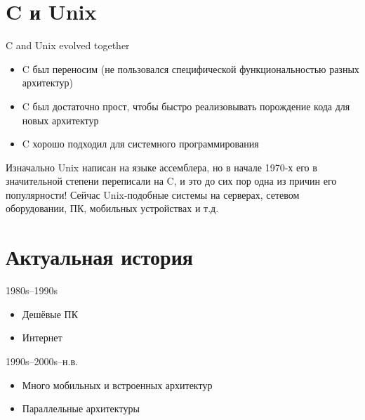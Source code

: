 \documentclass[xetex,aspectratio=169]{beamer}
\begin{document}
\section{C и Unix}

\begin{frame}{C and Unix evolved together}
	\begin{itemize}
		\item C был переносим (не пользовался специфической функциональностью разных архитектур)
		\item C был достаточно прост, чтобы быстро реализовывать порождение кода для новых архитектур
		\item C хорошо подходил для системного программирования
	\end{itemize}

	\pause
    Изначально Unix написан на языке ассемблера, но в начале 1970-х его в значительной степени переписали на C, и это до сих пор одна из причин его популярности! Сейчас Unix-подобные системы на серверах, сетевом оборудовании, ПК, мобильных устройствах и т.д.
\end{frame}

\section{Актуальная история}

\begin{frame}{1980s--1990s}
	\begin{itemize}
	\item Дешёвые ПК
	\item Интернет
	\end{itemize}
\end{frame}

\begin{frame}{1990s--2000s--н.в.}
	\begin{itemize}
		\item Много мобильных и встроенных архитектур
		\item Параллельные архитектуры
	\end{itemize}
\end{frame}

\postamble
\end{document}
